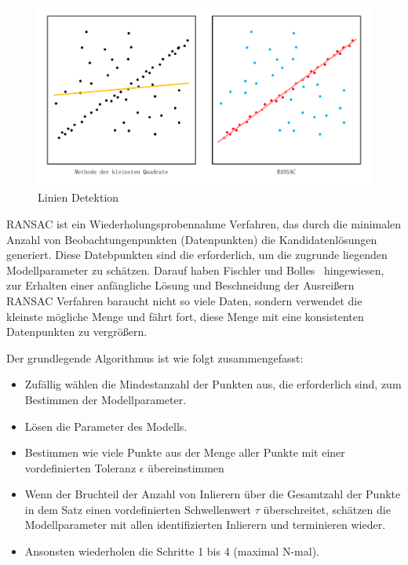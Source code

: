 \begin{figure}[H]
 \centering 
 \includegraphics[keepaspectratio,width=1.0\textwidth]{images/4_ZweiteErfahrung/RANSAC/Linien_Detektion.pdf}
 \caption{Linien Detektion}
 \label{fig:Linien Detektion}
\end{figure} 

RANSAC ist ein Wiederholungsprobennahme Verfahren, das  durch die minimalen Anzahl von Beobachtungenpunkten (Datenpunkten) die Kandidatenlösungen generiert. Diese Datebpunkten sind die erforderlich, um die zugrunde liegenden Modellparameter zu schätzen. Darauf haben Fischler und Bolles~\cite{ransac1} hingewiesen, zur Erhalten einer anfängliche Lösung und Beschneidung der Ausreißern RANSAC Verfahren baraucht nicht so viele Daten, sondern verwendet die kleinste mögliche Menge und fährt fort, diese Menge mit eine konsistenten Datenpunkten zu vergrößern.

Der grundlegende Algorithmus ist wie folgt zusammengefasst:

\begin{itemize}
	\item Zufällig wählen die Mindestanzahl der Punkten aus, die erforderlich sind, zum Bestimmen der Modellparameter.
	\item Lösen die Parameter des Modells.
	\item Bestimmen wie viele Punkte aus der Menge aller Punkte mit einer vordefinierten Toleranz $\epsilon$ übereinstimmen
	\item Wenn der Bruchteil der Anzahl von Inlierern über die Gesamtzahl der Punkte in dem Satz einen vordefinierten Schwellenwert $\tau$ überschreitet, schätzen die Modellparameter mit allen identifizierten Inlierern und terminieren wieder.
	\item Ansonsten wiederholen die Schritte 1 bis 4 (maximal N-mal).
\end{itemize}

